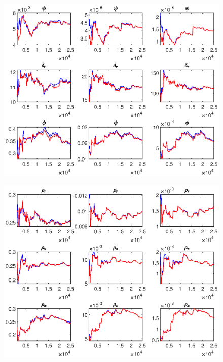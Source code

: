 \documentclass[11pt,preprint, authoryear]{elsarticle}
\let\origfigure\figure
\let\endorigfigure\endfigure
\renewenvironment{figure}[1][2] {
    \expandafter\origfigure\expandafter[H]
} {
    \endorigfigure
}
\numberwithin{equation}{section}
\numberwithin{figure}{section}
\numberwithin{table}{section}
\begin{document}
\begin{figure}
\begin{subfigure}[H]{0.49\textwidth}
         \includegraphics[width=\textwidth]{code/MCMC_3_money}
     \end{subfigure}
    \begin{subfigure}[H]{0.49\textwidth}
         \centering
         \includegraphics[width=\textwidth]{code/MCMC_4_money}
     \end{subfigure}
    \begin{subfigure}[H]{0.49\textwidth}
         \centering

\end{subfigure}
\end{figure}
\end{document}
